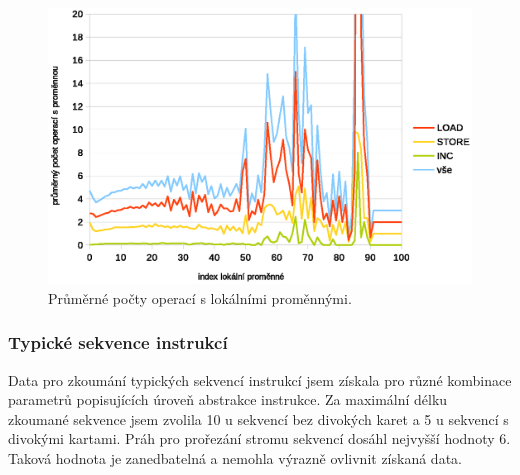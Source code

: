 \begin{figure}[h!]
\centering
\includegraphics[scale=0.9]{fig/locals} 
\caption{Průměrné počty operací s lokálními proměnnými.}\label{vars}
\end{figure}

\subsubsection{Typické sekvence instrukcí}

Data pro zkoumání typických sekvencí instrukcí jsem získala pro různé kombinace parametrů popisujících úroveň abstrakce instrukce. Za maximální délku zkoumané sekvence jsem zvolila 10 u sekvencí bez divokých karet a 5 u sekvencí s divokými kartami. Práh pro prořezání stromu sekvencí dosáhl nejvyšší hodnoty 6. Taková hodnota je zanedbatelná a nemohla výrazně ovlivnit získaná data. 



